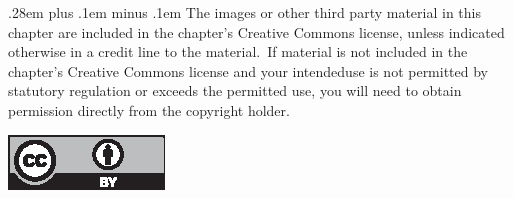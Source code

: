 \documentclass[orivec,runningheads]{llncs}
\begin{document}
{\small \spaceskip .28em plus .1em minus .1em The images or other third party material in this chapter are included in the chapter's Creative Commons license, unless indicated otherwise in a credit line to the material.~If material is not included in the chapter's Creative Commons license and your intended\break use is not permitted by statutory regulation or exceeds the permitted use, you will need to obtain permission directly from the copyright holder.}

\medskip\noindent\includegraphics{cc_by_4-0.eps}
\end{document}
